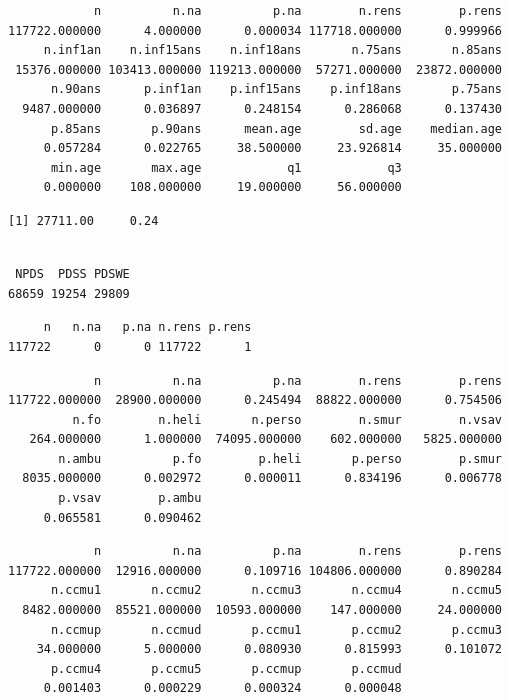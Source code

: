 \documentclass[]{article}
\begin{document}
\begin{verbatim}
            n          n.na          p.na        n.rens        p.rens 
117722.000000      4.000000      0.000034 117718.000000      0.999966 
     n.inf1an    n.inf15ans    n.inf18ans       n.75ans       n.85ans 
 15376.000000 103413.000000 119213.000000  57271.000000  23872.000000 
      n.90ans      p.inf1an    p.inf15ans    p.inf18ans       p.75ans 
  9487.000000      0.036897      0.248154      0.286068      0.137430 
      p.85ans       p.90ans      mean.age        sd.age    median.age 
     0.057284      0.022765     38.500000     23.926814     35.000000 
      min.age       max.age            q1            q3 
     0.000000    108.000000     19.000000     56.000000 
\end{verbatim}

\begin{verbatim}
[1] 27711.00     0.24
\end{verbatim}

\begin{verbatim}

 NPDS  PDSS PDSWE 
68659 19254 29809 
\end{verbatim}

\begin{verbatim}
     n   n.na   p.na n.rens p.rens 
117722      0      0 117722      1 
\end{verbatim}

\begin{verbatim}
            n          n.na          p.na        n.rens        p.rens 
117722.000000  28900.000000      0.245494  88822.000000      0.754506 
         n.fo        n.heli       n.perso        n.smur        n.vsav 
   264.000000      1.000000  74095.000000    602.000000   5825.000000 
       n.ambu          p.fo        p.heli       p.perso        p.smur 
  8035.000000      0.002972      0.000011      0.834196      0.006778 
       p.vsav        p.ambu 
     0.065581      0.090462 
\end{verbatim}

\begin{verbatim}
            n          n.na          p.na        n.rens        p.rens 
117722.000000  12916.000000      0.109716 104806.000000      0.890284 
      n.ccmu1       n.ccmu2       n.ccmu3       n.ccmu4       n.ccmu5 
  8482.000000  85521.000000  10593.000000    147.000000     24.000000 
      n.ccmup       n.ccmud       p.ccmu1       p.ccmu2       p.ccmu3 
    34.000000      5.000000      0.080930      0.815993      0.101072 
      p.ccmu4       p.ccmu5       p.ccmup       p.ccmud 
     0.001403      0.000229      0.000324      0.000048 
\end{verbatim}
\end{document}
